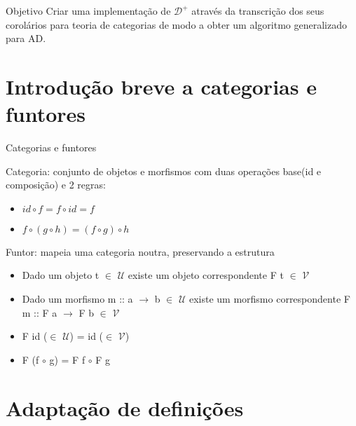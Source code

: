 \documentclass{beamer}
\theoremstyle{definition}
\theoremstyle{definition}
\theoremstyle{theorem}
\begin{document}
\begin{frame}{Objetivo}
Criar uma implementação de \ensuremath{\mathcal{D}^{+}} através da transcrição dos seus corolários para teoria de categorias
de modo a obter um algoritmo generalizado para AD.
\end{frame}





\section{Introdução breve a categorias e funtores}

\begin{frame}{Categorias e funtores}

Categoria: conjunto de objetos e morfismos com duas operações base(id e composição) e 2 regras:
\begin{itemize}
    \item $id \circ f = f \circ id = f$
    \item $f \circ (g \circ h) = (f \circ g) \circ h$
\end{itemize}


Funtor: mapeia uma categoria noutra, preservando a estrutura
\begin{itemize}
    \item Dado um objeto t $\in$ \ensuremath{\mathcal{U}} existe um objeto correspondente F t $\in$ \ensuremath{\mathcal{V}} 
    \item  Dado um morfismo m :: a \ensuremath{\rightarrow } b $\in$ \ensuremath{\mathcal{U}} existe um morfismo correspondente F m :: F a \ensuremath{\rightarrow } F b $\in$ \ensuremath{\mathcal{V}}
    \item F id ($\in$ \ensuremath{\mathcal{U}}) = id ($\in$ \ensuremath{\mathcal{V}})
    \item F (f $\circ$ g) = F f $\circ$ F g
\end{itemize}

\end{frame}


\section{Adaptação de definições}
\end{document}
